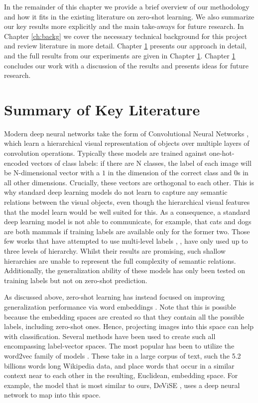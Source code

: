 \documentclass[12pt]{report}
\begin{document}
In the remainder of this chapter we provide a brief overview of our methodology and how it fits in the existing literature on zero-shot learning. We also summarize our key results more explicitly and the main take-aways for future research. In Chapter \ref{ch:backg} we cover the necessary technical background for this project and review literature in more detail. Chapter \ref{} presents our approach in detail, and the full results from our experiments are given in Chapter \ref{}. Chapter \ref{} concludes our work with a discussion of the results and presents ideas for future research.

\section{Summary of Key Literature}
Modern deep neural networks take the form of Convolutional Neural Networks \cite{Lecun2015}, which learn a hierarchical visual representation of objects over multiple layers of convolution operations. Typically these models are trained against one-hot-encoded vectors of class labels: if there are N classes, the label of each image will be N-dimensional vector with a $1$ in the dimension of the correct class and 0s in all other dimensions. Crucially, these vectors are orthogonal to each other. This is why standard deep learning models do not learn to capture any semantic relations between the visual objects, even though the hierarchical visual features that the model learn would be well suited for this. As a consequence, a standard deep learning model is not able to communicate, for example, that cats and dogs are both mammals if training labels are available only for the former two. Those few works that have attempted to use multi-level labels \cite{Wang2015}, \cite{Peterson2018}, have only used up to three levels of hierarchy. Whilst their results are promising, such shallow hierarchies are unable to represent the full complexity of semantic relations. Additionally, the generalization ability of these models has only been tested on training labels but not on zero-shot prediction.

As discussed above, zero-shot learning has instead focused on improving generalization performance via word embeddings \cite{Palatucci2009, Socher, Huang2012, Frome2013, Norouzi2013}. Note that this is possible because the embedding spaces are created so that they contain all the possible labels, including zero-shot ones. Hence, projecting images into this space can help with classification. Several methods have been used to create such all encompassing label-vector spaces. The most popular has been to utilize the word2vec family of models \cite{Mikolov, Mikolov2013}. These take in a large corpus of text, such the 5.2 billions words long Wikipedia data, and place words that occur in a similar context near to each other in the resulting, Euclidean, embedding space. For example, the model that is most similar to ours, DeViSE \cite{Frome2013}, uses a deep neural network to map into this space. 
\end{document}
